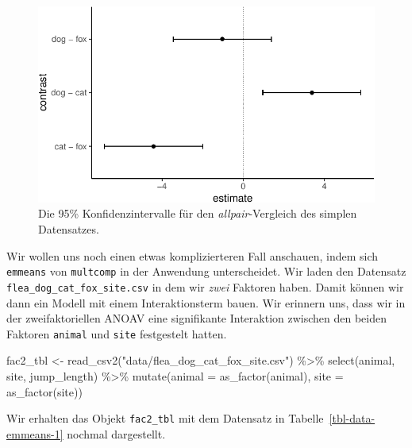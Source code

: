 \documentclass[
  letterpaper,
]{scrbook}
\newenvironment{Shaded}{\begin{snugshade}}{\end{snugshade}}
\newcommand{\AttributeTok}[1]{\textcolor[rgb]{0.40,0.45,0.13}{#1}}
\newcommand{\FunctionTok}[1]{\textcolor[rgb]{0.28,0.35,0.67}{#1}}
\newcommand{\NormalTok}[1]{\textcolor[rgb]{0.00,0.23,0.31}{#1}}
\newcommand{\OtherTok}[1]{\textcolor[rgb]{0.00,0.23,0.31}{#1}}
\newcommand{\SpecialCharTok}[1]{\textcolor[rgb]{0.37,0.37,0.37}{#1}}
\newcommand{\StringTok}[1]{\textcolor[rgb]{0.13,0.47,0.30}{#1}}
\begin{document}
\begin{figure}[H]

{\centering \includegraphics{./stat-tests-posthoc_files/figure-pdf/fig-emmeans-1-1.pdf}

}

\caption{\label{fig-emmeans-1}Die 95\% Konfidenzintervalle für den
\emph{allpair}-Vergleich des simplen Datensatzes.}

\end{figure}

Wir wollen uns noch einen etwas komplizierteren Fall anschauen, indem
sich \texttt{emmeans} von \texttt{multcomp} in der Anwendung
unterscheidet. Wir laden den Datensatz
\texttt{flea\_dog\_cat\_fox\_site.csv} in dem wir \emph{zwei} Faktoren
haben. Damit können wir dann ein Modell mit einem Interaktionsterm
bauen. Wir erinnern uns, dass wir in der zweifaktoriellen ANOAV eine
signifikante Interaktion zwischen den beiden Faktoren \texttt{animal}
und \texttt{site} festgestelt hatten.

\begin{Shaded}
\begin{Highlighting}[]
\NormalTok{fac2\_tbl }\OtherTok{\textless{}{-}} \FunctionTok{read\_csv2}\NormalTok{(}\StringTok{"data/flea\_dog\_cat\_fox\_site.csv"}\NormalTok{) }\SpecialCharTok{\%\textgreater{}\%} 
  \FunctionTok{select}\NormalTok{(animal, site, jump\_length) }\SpecialCharTok{\%\textgreater{}\%} 
  \FunctionTok{mutate}\NormalTok{(}\AttributeTok{animal =} \FunctionTok{as\_factor}\NormalTok{(animal),}
         \AttributeTok{site =} \FunctionTok{as\_factor}\NormalTok{(site))}
\end{Highlighting}
\end{Shaded}

Wir erhalten das Objekt \texttt{fac2\_tbl} mit dem Datensatz in
Tabelle~\ref{tbl-data-emmeans-1} nochmal dargestellt.
\end{document}
